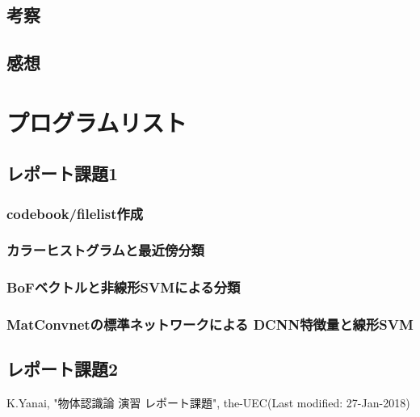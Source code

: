\documentclass[11pt,a4paper, uplatex]{jsreport}
\begin{document}
\section{考察}
\section{感想}

\appendix
\chapter{プログラムリスト}
\section{レポート課題1}
\subsection{codebook/filelist作成}

\subsection{カラーヒストグラムと最近傍分類}



\subsection{BoFベクトルと非線形SVMによる分類}




\subsection{MatConvnetの標準ネットワークによる DCNN特徴量と線形SVM}





\section{レポート課題2}
\begin{thebibliography}{数字}
   K.Yanai, "物体認識論 演習 レポート課題", the-UEC(Last modified: 27-Jan-2018)
\end{thebibliography}
\end{document}
